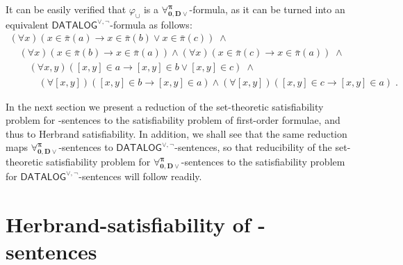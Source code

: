\documentclass[a4paper]{llncs}
\newcommand{\DisjDatalog}{\ensuremath{\mathsf{DATALOG}^{\vee,\neg}}\xspace}
\newcommand{\ForallpizeroDisjDatalog}{\ensuremath{\mathbf{\forall_{0,D\vee}^{\pi}}}\xspace}
\newcommand{\pair}[2]{[#1,#2]}
\newcommand{\pairin}[3]{\left[#1,#2\right] \in #3}
\newcommand{\nonpairin}[2]{#1 \in \bar{\pi}(#2)}
\newcommand{\red}[1]{\textcolor{red}{#1}}
\begin{document}
It can be easily verified that $\varphi_{\cup}$ is a
$\ForallpizeroDisjDatalog$-formula, as it can be turned into an equivalent
\DisjDatalog-formula as follows:
\[
\begin{array}{l}
\left(\forall x\right)\left(\nonpairin{x}{a} \rightarrow \nonpairin{x}{b}
\vee \nonpairin{x}{c}\right) \; \wedge \\
\quad  \left(\forall x\right)\left(\nonpairin{x}{b}
\rightarrow \nonpairin{x}{a}\right) \wedge \left(\forall x\right)
\left(\nonpairin{x}{c} \rightarrow \nonpairin{x}{a}\right) \; \wedge\\
\quad\quad\left(\forall x,y\right)\left(\pairin{x}{y}{a} \rightarrow
\pairin{x}{y}{b} \vee \pairin{x}{y}{c}\right) \; \wedge \\
\quad\quad\quad  \left(\forall
\pair{x}{y}\right)\left(\pairin{x}{y}{b} \rightarrow \pairin{x}{y}{a}\right)
\wedge \left(\forall
\pair{x}{y}\right)\left(\pairin{x}{y}{c} \rightarrow \pairin{x}{y}{a}\right) \;
.
\end{array}
\]


In the next section we present a reduction of the set-theoretic
satisfiability problem for \Forallpizero-sentences to the satisfiability
problem of first-order formulae, and thus to Herbrand
satisfiability. In addition, we shall see that the same reduction 
maps $\ForallpizeroDisjDatalog$-sentences
to $\DisjDatalog$-sentences, so that reducibility of the set-theoretic
satisfiability problem for $\ForallpizeroDisjDatalog$-sentences to the
satisfiability problem for $\DisjDatalog$-sentences will follow readily.


\section{Herbrand-satisfiability of \Forallpizero-sentences}\label{REDUCTION}

\newcommand{\regf}{\chi_1}
\newcommand{\exonef}{\chi_2}
\newcommand{\extwof}{\chi_3^{(V,T)}}
\newcommand{\eqf}{\chi_4^{(V,T)}}

\newcommand{\distPbyS}{\mathit{distBy}_{\pi}}
\newcommand{\distbyS}{\mathit{distBy}}
\newcommand{\distPS}{\mathsf{dist}_{\pi}}
\newcommand{\distS}{\mathsf{dist}}
\newcommand{\CPpizeroS}{P^{\bar{\pi}}}
\newcommand{\PpizeroS}{P^{[,]}}
\newcommand{\EqPpizeroS}{P^{=}}
\end{document}
